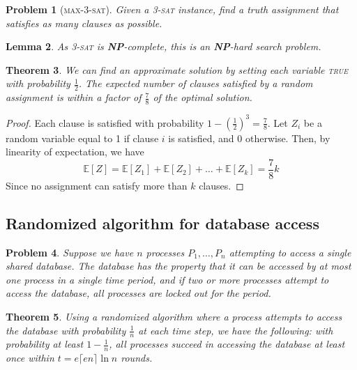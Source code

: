 \documentclass[10pt, oneside, reqno]{amsart}
\theoremstyle{plain}%
\newtheorem{thm}{Theorem}[section]
\newtheorem{prob}[thm]{Problem}
\newtheorem{lem}[thm]{Lemma}
\theoremstyle{definition}
\theoremstyle{remark}
\newcommand{\expc}[1]{\mathbb{E}\left[#1\right]}
\begin{document}
\begin{prob}[\textsc{max-3-sat}]
    Given a \textsc{3-sat} instance, find a truth assignment that satisfies as many clauses as possible.
\end{prob}

\begin{lem}
    As \textsc{3-sat} is \textbf{NP}-complete, this is an \textbf{NP}-hard search problem. 
\end{lem}

\begin{thm}
    We can find an approximate solution by setting each variable \textsc{true} with probability $\frac{1}{2}$.  The expected number of clauses satisfied by a random assignment is within a factor of $\frac{7}{8}$ of the optimal solution.
\end{thm}

\begin{proof}
    Each clause is satisfied with probability $1 - \left(\frac{1}{2}\right)^3 = \frac{7}{8}$.  Let $Z_i$ be a random variable equal to 1 if clause $i$ is satisfied, and $0$ otherwise.  Then, by linearity of expectation, we have\[
        \expc{Z} = \expc{Z_1} + \expc{Z_2} + \dots + \expc{Z_k} = \frac{7}{8}k
    \]  Since no assignment can satisfy more than $k$ clauses. 
\end{proof}
\subsection{Randomized algorithm for database access} %
\label{sub:randomized_algorithm_for_database_access}

\begin{prob}
    Suppose we have $n$ processes $P_1, \dots, P_n$ attempting to access a single shared database.  The database has the property that it can be accessed by at most one process in a single time period, and if two or more processes attempt to access the database, all processes are locked out for the period.
\end{prob}

\begin{thm}
    Using a randomized algorithm where a process attempts to access the database with probability $\frac{1}{n}$ at each time step, we have the following: with probability at least $1-\frac{1}{n}$, all processes succeed in accessing the database at least once within $t = e \lceil e n \rceil \ln n$ rounds. 
\end{thm}
\end{document}
